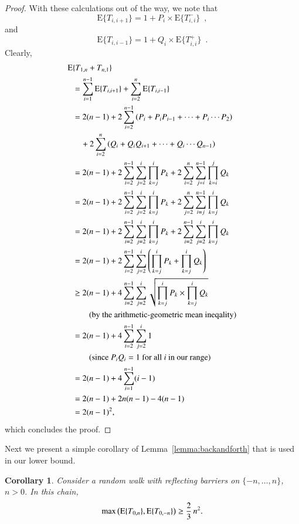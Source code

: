 \documentclass{elsarticle}
\newtheorem{corollary}{Corollary}
\newcommand{\EXP}{\mathrm{E}}
\begin{document}
\begin{proof}
With these calculations out of the way,  we note that
\[
\EXP \{ T_{i,i+1} \} = 1 + P_i \times \EXP \{ T^-_{i, i} \} \enspace ,
\]
and
\[
\EXP \{ T_{i,i-1} \} = 1 + Q_i \times \EXP \{ T^+_{i, i} \} \enspace .
\]
Clearly,
\[
\begin{aligned}
\EXP &\{  T_{1,n} + T_{n,1} \} \\
&= \sum_{i=1}^{n-1} \EXP \{ T_{i,i+1} \} + \sum_{i=2}^n \EXP \{ T_{i,i-1} \} \\
&= 2(n-1) + 2\sum_{i=2}^{n-1} \left( P_i + P_i P_{i-1} + \cdots + P_i \cdots P_{2} \right) \\ & \quad {} + 2\sum_{i=2}^n \left( Q_i + Q_i Q_{i+1} + \cdots + Q_i \cdots Q_{n-1} \right) \\
&= 2(n-1) + 2\sum_{i=2}^{n-1} \sum_{j=2}^i \prod_{k=j}^i P_k + 2\sum_{i=2}^n \sum_{j=i}^{n-1} \prod_{k=i}^j Q_k  \\
&= 2(n-1) + 2\sum_{i=2}^{n-1} \sum_{j=2}^i \prod_{k=j}^i P_k + 2\sum_{j=2}^n \sum_{i=j}^{n-1} \prod_{k=j}^i Q_k  \\
&= 2(n-1) + 2\sum_{i=2}^{n-1} \sum_{j=2}^i \prod_{k=j}^i P_k + 2\sum_{i=2}^{n-1} \sum_{j=2}^i \prod_{k=j}^i Q_k  \\
&= 2(n-1) + 2\sum_{i=2}^{n-1} \sum_{j=2}^i \left( \prod_{k=j}^i P_k + \prod_{k=j}^i Q_k \right)  \\
&\ge 2(n-1) + 4\sum_{i=2}^{n-1} \sum_{j=2}^i \sqrt{ \prod_{k=j}^i P_k \times \prod_{k=j}^i Q_k } \\
&\qquad \hbox{\rm (by the arithmetic-geometric mean ineqality)} \\
&= 2(n-1) + 4\sum_{i=2}^{n-1} \sum_{j=2}^i  1 \\
&\qquad \hbox{\rm (since $P_iQ_i = 1$ for all $i$ in our range)} \\
&= 2(n-1) + 4\sum_{i=1}^{n-1} (i-1) \\
&= 2(n-1) + 2 n (n-1) - 4 (n-1) \\
&= 2(n-1)^2,\\
\end{aligned}
\]
which concludes the proof.
\end{proof}

Next we present a simple corollary of Lemma~\ref{lemma:backandforth} that is used in our lower bound.

\begin{corollary}\label{cor:markov}
Consider a random walk with reflecting barriers on $\{ -n, \ldots, n \}$,
$n > 0$. In this chain,
\[
\max \left( \EXP \{ T_{0,n} \} , \EXP \{ T_{0,-n} \} \right)
 \ge  {2 \over 3} \, n^2.
\]
\end{corollary}
\end{document}
